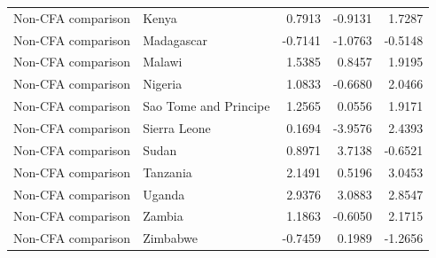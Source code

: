 \begin{table}
\begin{tabular}[t]{llrrr}
Non-CFA comparison & Kenya & 0.7913 & -0.9131 & 1.7287\\
\addlinespace
Non-CFA comparison & Madagascar & -0.7141 & -1.0763 & -0.5148\\
Non-CFA comparison & Malawi & 1.5385 & 0.8457 & 1.9195\\
Non-CFA comparison & Nigeria & 1.0833 & -0.6680 & 2.0466\\
Non-CFA comparison & Sao Tome and Principe & 1.2565 & 0.0556 & 1.9171\\
Non-CFA comparison & Sierra Leone & 0.1694 & -3.9576 & 2.4393\\
\addlinespace
Non-CFA comparison & Sudan & 0.8971 & 3.7138 & -0.6521\\
Non-CFA comparison & Tanzania & 2.1491 & 0.5196 & 3.0453\\
Non-CFA comparison & Uganda & 2.9376 & 3.0883 & 2.8547\\
Non-CFA comparison & Zambia & 1.1863 & -0.6050 & 2.1715\\
Non-CFA comparison & Zimbabwe & -0.7459 & 0.1989 & -1.2656\\
\bottomrule
\end{tabular}
\end{table}